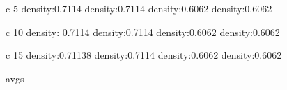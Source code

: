 c 5
density:0.7114
density:0.7114
density:0.6062
density:0.6062

c 10
density: 0.7114
density:0.7114
density:0.6062
density:0.6062

c 15
density:0.71138
density:0.7114
density:0.6062
density:0.6062


avgs











